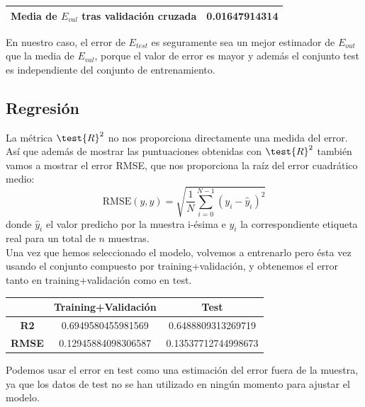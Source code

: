 \documentclass[12pt]{article}
\begin{document}
\begin{table}[H]
\centering
\begin{tabular}{|l|l|}
\hline
\textbf{Media de $E_{val}$ tras validación cruzada}   & 0.01647914314 \\ \hline
\end{tabular}
\end{table}

En nuestro caso, el error de $E_{test}$ es seguramente sea un mejor estimador de $E_{out}$ que la media de $E_{val}$, porque el valor de error es mayor y además el conjunto test es independiente del conjunto de entrenamiento.

\subsection{Regresión}

La métrica $\test{R}^2$ no nos proporciona directamente una medida del error. Así que además de mostrar las puntuaciones obtenidas con $\test{R}^2$ también vamos a mostrar el error RMSE, que nos proporciona la raíz del error cuadrático medio: $$\text{RMSE}(y, \hat{y}) = \sqrt{\frac{1}{N} \sum_{i=0}^{N - 1} (y_i - \hat{y}_i)^2}$$
donde $\hat{y}_i$ el valor predicho por la muestra i-ésima e $y_i$ la correspondiente etiqueta real para un total de $n$ muestras.\\

Una vez que hemos seleccionado el modelo, volvemos a entrenarlo pero ésta vez usando el conjunto compuesto por training+validación, y obtenemos el error tanto en training+validación como en test.

\begin{table}[H]
\centering
\begin{tabular}{c|c|c|}
\cline{2-3}
                                                & \textbf{Training+Validación} & \textbf{Test}       \\ \hline
\multicolumn{1}{|c|}{\textbf{R2}}               & 0.6949580455981569           & 0.6488809313269719  \\ \hline
\multicolumn{1}{|c|}{\textbf{RMSE}}             & 0.12945884098306587          & 0.13537712744998673 \\ \hline
\end{tabular}
\end{table}

Podemos usar el error en test como una estimación del error fuera de la muestra, ya que los datos de test no se han utilizado en ningún momento para ajustar el modelo.\\
\end{document}
